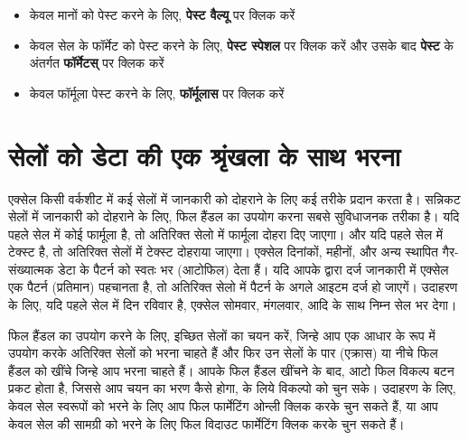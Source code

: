\begin{itemize}[topsep=-1ex,parsep=0ex,partopsep=0ex,itemsep=0.5ex]
\item केवल मानों को पेस्ट करने के लिए, \textbf{पेस्ट वैल्यू} पर क्लिक करें
\item केवल सेल के फॉर्मेट को पेस्ट करने के लिए, \textbf{पेस्ट स्पेशल} पर क्लिक करें और उसके बाद \textbf{पेस्ट} के अंतर्गत \textbf{फॉर्मेटस्} पर क्लिक करें
\item केवल फॉर्मूला पेस्ट करने के लिए, \textbf{फॉर्मूलास} पर क्लिक करें
\end{itemize}	
	
\section{सेलों को डेटा की एक श्रृंखला के साथ भरना}\label{id-1.34}

एक्सेल किसी वर्कशीट में कई सेलों में जानकारी को दोहराने के लिए कई तरीके प्रदान करता है। सन्निकट सेलों में जानकारी को दोहराने के लिए, फिल हैंडल का उपयोग करना सबसे सुविधाजनक तरीका है। यदि पहले सेल में कोई फार्मूला है, तो अतिरिक्त सेलो में फार्मूला दोहरा दिए जाएगा। और यदि पहले सेल में टेक्स्ट है, तो अतिरिक्त सेलों में टेक्स्ट दोहराया जाएगा। एक्सेल दिनांकों, महीनों, और अन्य स्थापित गैर-संख्यात्मक डेटा के पैटर्न को स्वतः भर (आटोफिल) देता हैं। यदि आपके द्वारा दर्ज जानकारी में एक्सेल एक पैटर्न (प्रतिमान) पहचानता है, तो अतिरिक्त सेलो में पैटर्न के अगले आइटम दर्ज हो जाएगें। उदाहरण के लिए, यदि पहले सेल में दिन रविवार है, एक्सेल सोमवार, मंगलवार, आदि के साथ निम्न सेल भर देगा।


फिल हैंडल का उपयोग करने के लिए, इच्छित सेलों का चयन करें, जिन्हे आप एक आधार के रूप में उपयोग करके अतिरिक्त सेलों को भरना चाहते हैं और फिर उन सेलों के पार (एक्रास) या नीचे फिल हैंडल को खींचे जिन्हे आप भरना चाहते हैं। आपके फिल हैंडल खींचने के बाद, आटो फिल विकल्प बटन प्रकट होता है, जिससे आप चयन का भरण कैसे होगा, के लिये विकल्पो को चुन सके। उदाहरण के लिए, केवल सेल स्वरूपों को भरने के लिए आप फिल फार्मेटिंग ओन्ली क्लिक करके चुन सकते हैं, या आप केवल सेल की सामग्री को भरने के लिए फिल विदाउट फार्मेटिंग क्लिक करके चुन सकते हैं।
				
